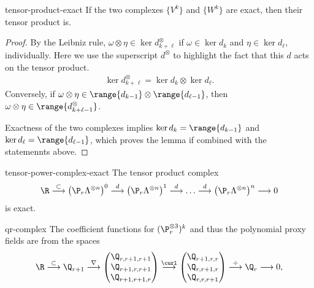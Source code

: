 \begin{Lemma}{tensor-product-exact}
  If the two complexes $\{V^k\}$ and $\{W^k\}$ are exact, then their tensor product is.
\end{Lemma}

\begin{proof}
  By the Leibniz rule,
  $\omega\otimes\eta \in \ker{d_{k+\ell}^\otimes}$ if
  $\omega\in\ker{d_k}$ and $\eta\in\ker{d_\ell}$, individually. Here
  we use the superscript $d^\otimes$ to highlight the fact that this
  $d$ acts on the tensor product.
  \begin{gather}
    \ker{d_{k+\ell}^\otimes} = \ker{d_k} \otimes \ker{d_\ell}.
  \end{gather}
  Conversely, if $\omega\otimes\eta\in\range{d_{k-1}}\otimes \range{d_{\ell-1}}$,
  then $\omega\otimes\eta\in\range{d_{k+\ell-1}^\otimes}$.

  Exactness of the two complexes implies $\ker{d_k} = \range{d_{k-1}}$
  and $\ker{d_\ell} = \range{d_{\ell-1}}$, which proves the lemma if
  combined with the statemennts above.
\end{proof}

\begin{Corollary}{tensor-power-complex-exact}
  The tensor product complex
  \begin{gather}
    \R
    \overset{\subset}{\longrightarrow}
    \left(\P_r\Lambda^{\otimes n}\right)^0
    \overset{d}{\longrightarrow}    
    \left(\P_r\Lambda^{\otimes n}\right)^1
    \overset{d}{\longrightarrow}
    \dots
    \overset{d}{\longrightarrow}    
    \left(\P_r\Lambda^{\otimes n}\right)^n
    \longrightarrow 0
  \end{gather}
  is exact.
\end{Corollary}

\begin{Lemma}{qr-complex}
  The coefficient functions for $(\P_r^{\otimes 3})^k$ and thus the
  polynomial proxy fields are from the spaces
  \begin{gather}
    \R
    \overset{\subset}{\longrightarrow} \Q_{r+1}
    \overset{\nabla}{\longrightarrow}
    \begin{pmatrix}
      \Q_{r,r+1,r+1}\\\Q_{r+1,r,r+1}\\\Q_{r+1,r+1,r}
    \end{pmatrix}
    \overset{\curl}{\longrightarrow}
    \begin{pmatrix}
      \Q_{r+1,r,r}\\\Q_{r,r+1,r}\\\Q_{r,r,r+1}
    \end{pmatrix}
    \overset{\div}{\longrightarrow}
    \Q_r
    \longrightarrow 0,    
  \end{gather}
\end{Lemma}


